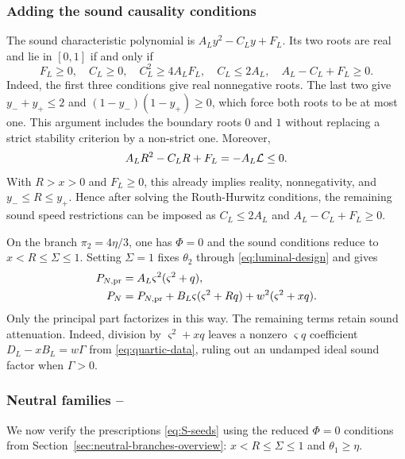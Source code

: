 \subsubsection*{Adding the sound causality conditions}
The sound characteristic polynomial is $A_Ly^2-C_Ly+F_L$.
Its two roots are real and lie in $[0,1]$ if and only if
\begin{equation}\label{app:eq:neutral-design-causal}
 F_L\geq0,\quad C_L\geq0,\quad C_L^2\geq4A_LF_L,\quad
 C_L\leq2A_L,\quad A_L-C_L+F_L\geq0.
\end{equation}
Indeed, the first three conditions give real nonnegative roots.
The last two give $y_-+y_+\leq2$ and
$(1-y_-)(1-y_+)\geq0$, which force both roots to be at most one.
This argument includes the boundary roots $0$ and $1$ without replacing a
strict stability criterion by a non-strict one.
Moreover,
\begin{equation}\label{app:eq:neutral-design-interlacing}
 A_LR^2-C_LR+F_L=-A_L\mathcal L\leq0.
\end{equation}
With $R>x>0$ and $F_L\geq0$, this already implies reality,
nonnegativity, and $y_-\leq R\leq y_+$. Hence after solving the
Routh-Hurwitz conditions, the remaining sound speed restrictions can be
imposed as $C_L\leq2A_L$ and $A_L-C_L+F_L\geq0$.

On the branch $\pi_2=4\eta/3$, one has $\Phi=0$ and the sound conditions
reduce to $x<R\leq\Sigma\leq1$. Setting $\Sigma=1$ fixes
$\theta_2$ through \eqref{eq:luminal-design} and gives
\begin{equation}\label{app:eq:neutral-design-principal-factor}
 \begin{aligned}
 P_{N,\rm pr}&=A_L\varsigma^2(\varsigma^2+q),\\
 P_N&=P_{N,\rm pr}+B_L\varsigma(\varsigma^2+Rq)+w^2(\varsigma^2+xq).
 \end{aligned}
\end{equation}
Only the principal part factorizes in this way. The remaining terms
retain sound attenuation. Indeed, division by $\varsigma^2+xq$ leaves a
nonzero $\varsigma q$ coefficient $D_L-xB_L=w\Gamma$ from
\eqref{eq:quartic-data}, ruling out an undamped ideal sound factor when
$\Gamma>0$.


\subsubsection{Neutral families --}
\label{app:sec:neutral-family-derivations}
We now verify the prescriptions \eqref{eq:S-seeds} using the reduced
$\Phi=0$ conditions from Section~\ref{sec:neutral-branches-overview}:
$x<R\leq\Sigma\leq1$ and $\theta_1\geq\eta$.

